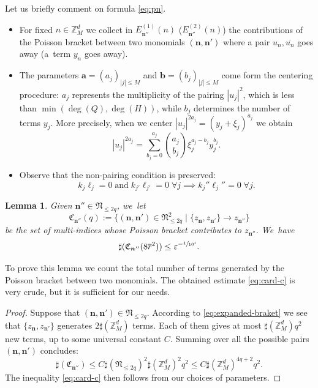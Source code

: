 \documentclass[JEP,XML,SOM,Unicode,published]{cedram}
\theoremstyle{plain}
\newtheorem{lemma}[theorem]{Lemma}
\theoremstyle{definition}
\newcommand{\nb}{{\boldsymbol n}}
\newcommand{\Nb}{{\boldsymbol{\mathfrak{N}}}}
\newcommand{\Z}{\mathbb{Z}}
\newcommand{\1}{\mathbf{1}}
\let\epsilon\varepsilon
\begin{document}
Let us briefly comment on formula \eqref{eq:pn}.
\begin{itemize}
\item For fixed $n\in\Z_{M}^{d}$ we collect in $E_{\nb''}^{(1)}(n)$ (\resp $E_{\nb''}^{(2)}(n)$) the contributions of the Poisson bracket between two monomials $(\nb,\nb')$ where a pair $u_n,\overline{u_{n}}$ goes away (\resp a~term $y_n$ goes away).
\item The parameters $\boldsymbol{a}=(a_{j})_{|j|\leq M}$ and $\boldsymbol{b}=(b_{j})_{|j|\leq M}$ come form the centering procedure: $a_{j}$ represents the multiplicity of the pairing $|u_{j}|^{2}$, which is less than $\min(\deg(Q),\deg(H))$, while $b_{j}$ determines the number of terms $y_{j}$. More precisely, when we center $|u_j|^{2a_{j}}=(y_{j}+\xi_j)^{a_{j}}$ we obtain
\[
|u_j|^{2a_{j}} = \sum_{b_{j}=0}^{a_{j}} \binom{a_{j}}{b_{j}}\xi_j^{a_{j}-b_{j}}y_j^{b_{j}}.
\]
\item Observe that the non-pairing condition is preserved:
\[
k_{j}\ell_{j}=0\; \text{and}\; k_{j'}\ell_{j'}=0\; \forall j\implies k_{j}''\ell_{j}''=0\; \forall j.
\]
\end{itemize}

\begin{lemma} Given $\nb''\in\Nb_{\leq2q}$, we~let
\[
\mathfrak{C}_{\nb''}(q) := \{ (\nb,\nb')\in\Nb_{\leq 2q}^{2}\mid \{z_{\nb},z_{\nb'}\}\to z_{\nb''}\}
\]
be the set of multi-indices whose Poisson bracket contributes to $z_{\nb''}$. We~have
\begin{equation}
\label{eq:card-c}
\sharp(\mathfrak{C}_{\nb''}(8\overline{r}^{2}))\leq \epsilon^{-\sfrac{1}{10^{4}}}.
\end{equation}
\end{lemma}
To prove this lemma we count the total number of terms generated by the Poisson bracket between two monomials. The obtained estimate \eqref{eq:card-c} is very crude, but it is sufficient for our needs.
\begin{proof} Suppose that $(\nb,\nb')\in\Nb_{\leq 2q}$. According to \eqref{eq:expanded-braket} we see that $\{z_{\nb},z_{\nb'}\}$ generates $2\sharp(\Z_{M}^{d})$ terms. Each of them gives at most $\sharp(\Z_{M}^{d})q^{2}$ new terms, up to some universal constant $C$. Summing over all the possible pairs $(\nb,\nb')$ concludes:
\[
\sharp(\mathfrak{C}_{\nb''})\leq C\sharp(\Nb_{\leq 2q})^{2}\sharp(\Z_{M}^{d})^{2}q^{2}\leq C\sharp(\Z_{M}^{d})^{4q+2}q^{2}.
\]
The inequality \eqref{eq:card-c} then follows from our choices of parameters.
\end{proof}
\end{document}
